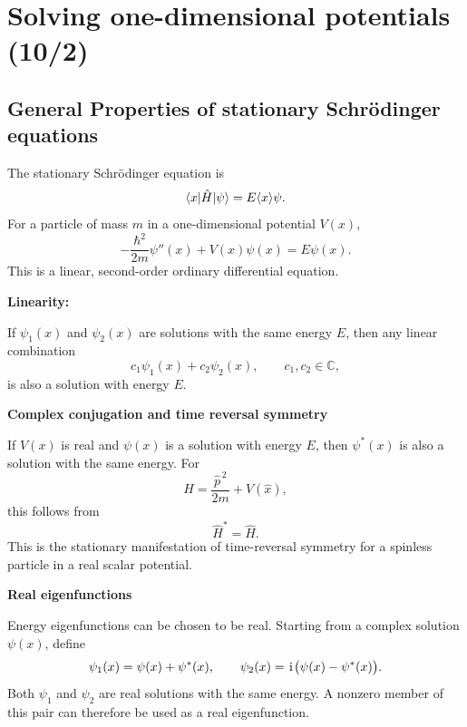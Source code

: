 \section{Solving one-dimensional potentials (10/2)}


\subsection{General Properties of stationary Schr\"odinger equations}

The stationary Schr\"odinger equation is
\begin{equation}
 \langle{x}|\hat H|{\psi}\rangle=E\langle{x}\rangle{\psi}.
\end{equation}
For a particle of mass $m$ in a one-dimensional potential $V(x)$,
\begin{equation}
 \boxed{
 -\frac{\hbar^2}{2m}\psi''(x)+V(x)\psi(x)=E\psi(x).}
\end{equation}
This is a linear, second-order ordinary differential equation.

\textbf{Linearity:}

If $\psi_1(x)$ and $\psi_2(x)$ are solutions with the same energy $E$, then
any linear combination
\begin{equation}
 c_1\psi_1(x)+c_2\psi_2(x),
 \qquad c_1,c_2\in\mathbb C,
\end{equation}
is also a solution with energy $E$.

\textbf{Complex conjugation and time reversal symmetry}

If $V(x)$ is real and $\psi(x)$ is a solution with energy $E$, then
$\psi^*(x)$ is also a solution with the same energy. For
\begin{equation}
 \hat H=\frac{\hat p^{\,2}}{2m}+V(\hat x),
\end{equation}
this follows from
\begin{equation}
 \hat H^*=\hat H.
\end{equation}
This is the stationary manifestation of time-reversal symmetry for a
spinless particle in a real scalar potential.

\textbf{Real eigenfunctions}

Energy eigenfunctions can be chosen to be real. Starting from a complex
solution $\psi(x)$, define
\begin{equation}
 \psi_1(x)=\psi(x)+\psi^*(x),
 \qquad
 \psi_2(x)=\hspace{1pt}\mathrm{i}\hspace{1pt}\bigl(\psi(x)-\psi^*(x)\bigr).
\end{equation}
Both $\psi_1$ and $\psi_2$ are real solutions with the same energy. A
nonzero member of this pair can therefore be used as a real eigenfunction.

